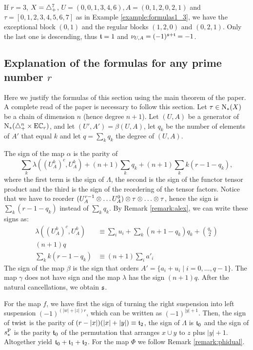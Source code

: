 \begin{example}
	If $r=3$, $X= \triangle_{+}^7$, $U = (0,0,1,3,4,6), A = (0,1,2,0,2,1)$ and $\tau = [0,1,2,3,4,5,6,7]$ as in Example \ref{example:formulas1_3}, we have the exceptional block $(0,1)$ and the regular blocks $(1,2,0)$ and $(0,2,1)$. Only the last one is descending, thus $\mathfrak{t} = 1$ and $\nu_{U,A} = (-1)^{\mathfrak{s}+\mathfrak{t}} = -1$.
\end{example}

\subsection{Explanation of the formulas for any prime number \texorpdfstring{$r$}{r}} Here we justify the formulas of this section using the main theorem of the paper. A complete read of the paper is necessary to follow this section. Let $\tau\in \operatorname{N}_{*}(X)$ be a chain of dimension $n$ (hence degree $n+1$). Let $(U,A)$ be a generator of $\operatorname{N}_{*}(\triangle_{+}^n\times \mathrm{E}\mathbb{C}_r)$, and let $(U',A') = \beta(U,A)$, let $q_k$ be the number of elements of $A'$ that equal $k$ and let $q = \sum_{k}q_k$ the degree of $(U,A)$.

The sign of the map $\alpha$ is the parity of
\[
	\sum_{k}\lambda((U_A^{k})^c,U_A^k) + (n+1)\sum_k q_k + (n+1)\sum_kk(r-1-q_k),
\]
where the first term is the sign of $\Lambda$, the second is the sign of the functor tensor product and the third is the sign of the reordering of the tensor factors. Notice that we have to reorder $(U^{r-1}_A \otimes  \ldots U^0_A) \otimes  \tau \otimes \ldots \otimes  \tau$, hence the sign is $\sum_k(r-1-q_k)$ instead of $\sum_k q_k$. By Remark \ref{remark:alex}, we can write these signs as:
\begin{align}
\label{signo:lambda}	\lambda((U_A^k)^c,U^k_A) &\equiv \sum_i u_i + \sum_k(n+1-q_k)q_k + \binom{q_k}{2}
\\
\label{signo:prod} (n+1)q
\\
 \label{signo:reord} \sum_kk(r-1-q_k)&\equiv (n+1)\sum_{i} a'_i
\end{align}
The sign of the map $\beta$ is the sign that orders $A'  = \{a_i+u_i\mid i=0,\ldots,q-1\}$. The map $\gamma$ does not have sign and the map $\lambda$ has the sign $(n+1)q$. After the natural cancellations, we obtain $\mathfrak{s}$.

For the map $f$, we have first the sign of turning the right suspension into left suspension $(-1)^{(|w|+|z|)r}$, which can be written as $(-1)^{|y|+1}$. Then, the sign of $\operatorname{twist}$ is the parity of $(r-|x|)(|x|+|y|) \equiv \mathfrak{t}_2$, the sign of $\Lambda$ is $\mathfrak{t}_0$ and the sign of $s_*^{\operatorname{P}}$ is the parity $\mathfrak{t}_0$ of the permutation that arranges $x\cup y$ to $z$ plus $|y|+1$. Altogether yield $\mathfrak{t}_0+\mathfrak{t}_1+\mathfrak{t}_2$. For the map $\Phi$ we follow Remark \ref{remark:phidual}.

